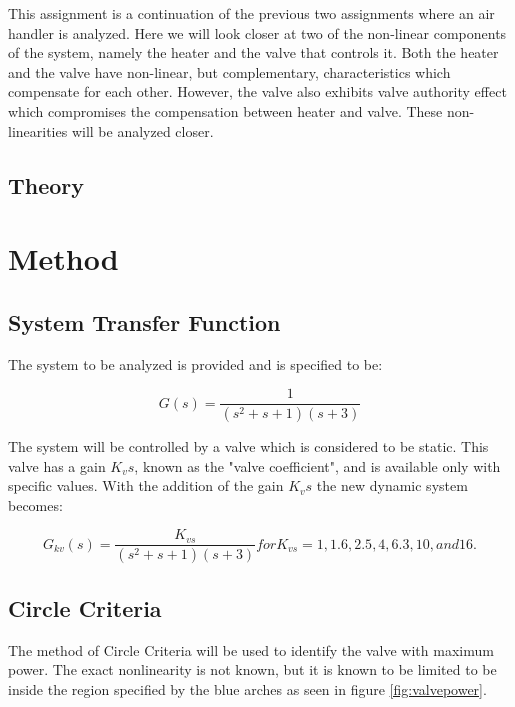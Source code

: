 \documentclass[a4paper, titlepage]{article}
\begin{document}
This assignment is a continuation of the previous two assignments where an air handler is analyzed.
Here we will look closer at two of the non-linear components of the system, namely the heater and the valve that controls it.
Both the heater and the valve have non-linear, but complementary, characteristics which compensate for each other.  However, the valve also exhibits valve authority effect which compromises the compensation between heater and valve.  These non-linearities will be analyzed closer. 
\citep[p.123]{glad00}

\subsection{Theory}
\section{Method}
\subsection{System Transfer Function}
The system to be analyzed is provided and is specified to be:

\begin{equation}
	G(s) = \frac{1}{(s^2+s+1)(s+3)}
	\label{equ:system}
\end{equation}

The system will be controlled by a valve which is considered to be static.  This valve has a gain $K_vs$, known as the "valve coefficient", and is available only with specific values.
With the addition of the gain $K_vs$ the new dynamic system becomes:

\begin{equation}
	G_{kv}(s) = \frac{K_{vs}}{(s^2+s+1)(s+3)} for K_{vs}=1, 1.6, 2.5, 4, 6.3, 10, and 16.
	\label{equ:systemTF}
\end{equation}


\subsection{Circle Criteria}

The method of Circle Criteria will be used to identify the valve with maximum power.  The exact nonlinearity is not known, but it is known to be limited to be inside the region specified by the blue arches as seen in figure \ref{fig:valvepower}.
\end{document}

